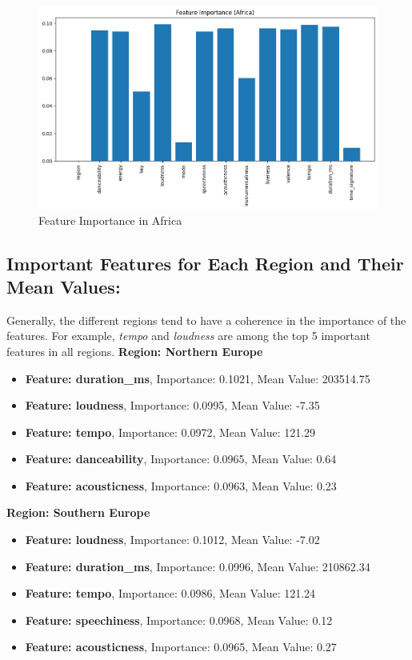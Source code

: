 \begin{figure}[h]
    \centering
    \begin{minipage}{0.45\textwidth}
        \centering
        \includegraphics[width=\linewidth]{media/rf_feature_imp_africa.png}
        \caption{Feature Importance in Africa}
    \end{minipage}
\end{figure}

\clearpage 

\subsection{Important Features for Each Region and Their Mean Values:}

Generally, the different regions tend to have a coherence in the importance of the features. For example, \textit{tempo} and \textit{loudness} are among the top 5 important features in all regions. 
\textbf{Region: Northern Europe }
\begin{itemize}
    \item \textbf{Feature: duration\_ms}, Importance: 0.1021, Mean Value: 203514.75
    \item \textbf{Feature: loudness}, Importance: 0.0995, Mean Value: -7.35
    \item \textbf{Feature: tempo}, Importance: 0.0972, Mean Value: 121.29
    \item \textbf{Feature: danceability}, Importance: 0.0965, Mean Value: 0.64
    \item \textbf{Feature: acousticness}, Importance: 0.0963, Mean Value: 0.23
\end{itemize}

\textbf{Region: Southern Europe }
\begin{itemize}
    \item \textbf{Feature: loudness}, Importance: 0.1012, Mean Value: -7.02
    \item \textbf{Feature: duration\_ms}, Importance: 0.0996, Mean Value: 210862.34
    \item \textbf{Feature: tempo}, Importance: 0.0986, Mean Value: 121.24
    \item \textbf{Feature: speechiness}, Importance: 0.0968, Mean Value: 0.12
    \item \textbf{Feature: acousticness}, Importance: 0.0965, Mean Value: 0.27
\end{itemize}

